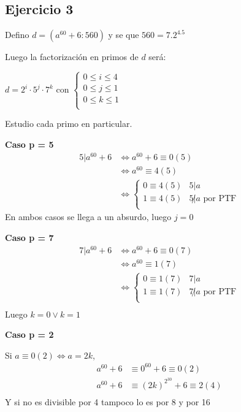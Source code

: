 \subsection{Ejercicio 3}

Defino $ d = (a^{60} + 6:560) $ y se que $ 560 = 7.2^4.5 $

Luego la factorización en primos de $d$ será:

$ d = 2^i \cdot 5^j \cdot 7^k $ con $ \begin{cases}
    0\leq i \leq 4 \\
    0\leq j \leq 1 \\
    0\leq k \leq 1 \\
\end{cases} $

Estudio cada primo en particular.

\textbf{Caso p = 5}
\begin{align*}
    5 | a^{60} + 6 &\iff a^{60} + 6 \equiv 0 (5) \\
    &\iff a^{60} \equiv 4 (5) \\
    &\iff \begin{cases}
        0 \equiv 4(5) & 5|a \\
        1 \equiv 4(5) & 5 \not | a \text{ por PTF} \\
    \end{cases}
\end{align*}
En ambos casos se llega a un absurdo, luego $ j = 0 $

\textbf{Caso p = 7}
\begin{align*}
    7 | a^{60} + 6 &\iff a^{60} + 6 \equiv 0 (7) \\
    &\iff a^{60} \equiv 1 (7) \\
    &\iff \begin{cases}
        0 \equiv 1(7) & 7|a \\
        1 \equiv 1(7) & 7\not |a \text{ por PTF} \\
    \end{cases} \\
\end{align*}
Luego $ k = 0 \vee k = 1 $

\textbf{Caso p = 2}

Si $ a \equiv 0(2) \iff a = 2k $,
\begin{align*}
    a^{60} + 6 &\equiv 0^{60} + 6 \equiv 0 (2) \\
    a^{60} + 6 &\equiv (2k)^{2^{30}} + 6 \equiv 2 (4) \\
\end{align*}
Y si no es divisible por 4 tampoco lo es por 8 y por 16

